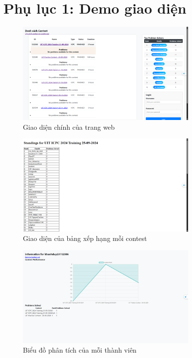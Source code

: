 \documentclass[12pt,a4paper]{article}
\begin{document}
	\section*{Phụ lục 1: Demo giao diện}
	
	\begin{figure}[h!]
		    \centering
		   \includegraphics[width=0.8\textwidth]{test1.png}
		  \caption{Giao diện chính của trang web}
	 \end{figure}
	
	\begin{figure}[h!]
		\centering
		\includegraphics[width=0.8\textwidth]{test2.png}
		\caption{Giao diện của bảng xếp hạng mỗi contest}
	\end{figure}
	
	\begin{figure}[h!]
		\centering
		\includegraphics[width=0.8\textwidth]{test3.png}
		\caption{Biểu đồ phân tích của mỗi thành viên}
	\end{figure}
	
\end{document}
